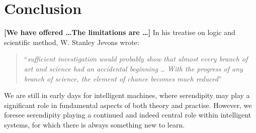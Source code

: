 \section{Conclusion} \label{sec:conclusion}

\textbf{[We have offered \ldots The limitations are \ldots]}
In his treatise on logic and scientific method, W. Stanley Jevons
wrote:
\begin{quote}
``\emph{sufficient investigation would probably show that almost every
    branch of art and science had an accidental beginning} \ldots
  \emph{With the progress of any branch of science, the element of
    chance becomes much reduced}'' \cite[p. 531]{jevons:1877}
\end{quote}
We are still in early days for intelligent machines, where serendipity
may play a significant role in fundamental aspects of both theory and
practise.  However, we foresee serendipity playing a continued and indeed
central role within intelligent systems, for which there is always
something new to learn.
